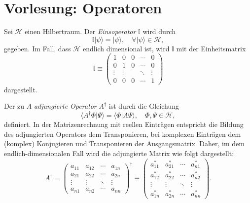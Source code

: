 
\section{Vorlesung: Operatoren}

\begin{definition}
	Sei $\mathcal{H}$ einen Hilbertraum.
	Der \emph{Einsoperator} $\mathbb{I}$ wird durch
	\begin{equation}
		\mathbb{I} |\psi\rangle = |\psi\rangle, \quad \forall |\psi\rangle\in\mathcal{H},
	\end{equation}
	gegeben. Im Fall, dass $\mathcal{H}$ endlich dimensional ist, wird $\mathbb{I}$ mit der Einheitsmatrix
	\begin{equation}
		\mathbb{I} \equiv \begin{pmatrix}
			1 & 0 & 0 & \cdots & 0 \\
			0 & 1 & 0 & \cdots & 0 \\
			\vdots & \vdots &  & \ddots & \vdots \\
			0 & 0 & 0 & \cdots & 1 
		\end{pmatrix}
	\end{equation}
	dargestellt.
\end{definition}

Der zu $A$ \emph{adjungierte Operator} $A^\dag$ ist durch die Gleichung
\begin{equation}
	\langle A^\dag\Phi|\Psi\rangle = \langle \Phi|A\Psi\rangle, \quad \Phi,\Psi\in \mathcal{H},
\end{equation}
definiert. In der Matrizenrechnung mit reellen Einträgen entspricht die Bildung des adjungierten Operators dem Transponieren, bei komplexen Einträgen dem (komplex) Konjugieren und Transponieren der Ausgangsmatrix. Daher, im dem endlich-dimensionalen Fall wird die adjungierte Matrix wie folgt dargestellt:
\begin{equation}
	A^\dag = \begin{pmatrix}
		a_{11} & a_{12} & \cdots & a_{1n} \\
		a_{21} & a_{22} & \cdots & a_{2n} \\
		\vdots & \vdots & \ddots & \vdots \\
		a_{n1} & a_{n2} & \cdots & a_{nn} 
	\end{pmatrix}^\dag \equiv \begin{pmatrix}
		a_{11}^* & a_{21}^* & \cdots & a_{n1}^* \\
		a_{12}^* & a_{22}^* & \cdots & a_{n2}^* \\
		\vdots & \vdots & \ddots & \vdots \\
		a_{1n}^* & a_{2n}^* & \cdots & a_{nn}^* 
	\end{pmatrix}.
\end{equation}

